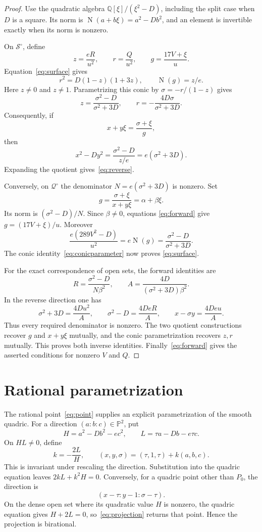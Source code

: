 \documentclass[11pt,a4paper]{article}
\theoremstyle{remark}\newtheorem{remark}[theorem]{Remark}
\newcommand{\Q}{\mathbb Q}\newcommand{\PP}{\mathbb P}
\DeclareMathOperator{\N}{N}
\begin{document}
\begin{proof}
Use the quadratic algebra $\Q[\xi]/(\xi^2-D)$, including the split
case when $D$ is a square. Its norm is
$\N(a+b\xi)=a^2-Db^2$, and an element is invertible exactly when
its norm is nonzero.

On $\mathcal S^\circ$, define
\[
 z=\frac{eR}{u^2},\qquad r=\frac Q{u^2},\qquad
 g=\frac{17V+\xi}{u}.
\]
Equation~\eqref{eq:surface} gives
\[
 r^2=D(1-z)(1+3z),\qquad \N(g)=z/e.
\]
Here $z\ne0$ and $z\ne1$. Parametrizing this conic by
$\sigma=-r/(1-z)$ gives
\begin{equation}\label{eq:conicparameter}
 z=\frac{\sigma^2-D}{\sigma^2+3D},\qquad
 r=-\frac{4D\sigma}{\sigma^2+3D}.
\end{equation}
Consequently, if
\[
                         x+y\xi=\frac{\sigma+\xi}{g},
\]
then
\[
 x^2-Dy^2=\frac{\sigma^2-D}{z/e}
                        =e(\sigma^2+3D).
\]
Expanding the quotient gives~\eqref{eq:reverse}.

Conversely, on $\mathcal Q^\circ$ the denominator
$N=e(\sigma^2+3D)$ is nonzero. Set
\[
               g=\frac{\sigma+\xi}{x+y\xi}
                 =\alpha+\beta\xi.
\]
Its norm is $(\sigma^2-D)/N$. Since $\beta\ne0$, equations
\eqref{eq:forward} give $g=(17V+\xi)/u$. Moreover
\[
 \frac{e(289V^2-D)}{u^2}
       =e\N(g)=\frac{\sigma^2-D}{\sigma^2+3D}.
\]
The conic identity~\eqref{eq:conicparameter} now proves
\eqref{eq:surface}.

For the exact correspondence of open sets, the forward identities are
\[
 R=\frac{\sigma^2-D}{N\beta^2},\qquad
 A=\frac{4D}{(\sigma^2+3D)\beta^2}.
\]
In the reverse direction one has
\[
 \sigma^2+3D=\frac{4Du^2}{A},\qquad
 \sigma^2-D=\frac{4DeR}{A},\qquad
 x-\sigma y=\frac{4Deu}{A}.
\]
Thus every required denominator is nonzero. The two quotient
constructions recover $g$ and $x+y\xi$ mutually, and the conic
parametrization recovers $z,r$ mutually. This proves both inverse
identities. Finally~\eqref{eq:forward} gives the asserted conditions
for nonzero $V$ and $Q$.
\end{proof}

\section{Rational parametrization}
The rational point~\eqref{eq:point} supplies an explicit parametrization
of the smooth quadric. For a direction $(a:b:c)\in\PP^2$, put
\[
 H=a^2-Db^2-ec^2,\qquad
 L=\tau a-Db-e\tau c.
\]
On $HL\ne0$, define
\begin{equation}\label{eq:projection}
 k=-\frac{2L}{H},\qquad
             (x,y,\sigma)=(\tau,1,\tau)+k(a,b,c).
\end{equation}
This is invariant under rescaling the direction. Substitution into
the quadric equation leaves $2kL+k^2H=0$. Conversely, for a quadric
point other than $P_0$, the direction is
\[
                         (x-\tau:y-1:\sigma-\tau).
\]
On the dense open set where its quadratic value $H$ is nonzero,
the quadric equation gives $H+2L=0$, so~\eqref{eq:projection}
returns that point. Hence the projection is birational.
\end{document}
